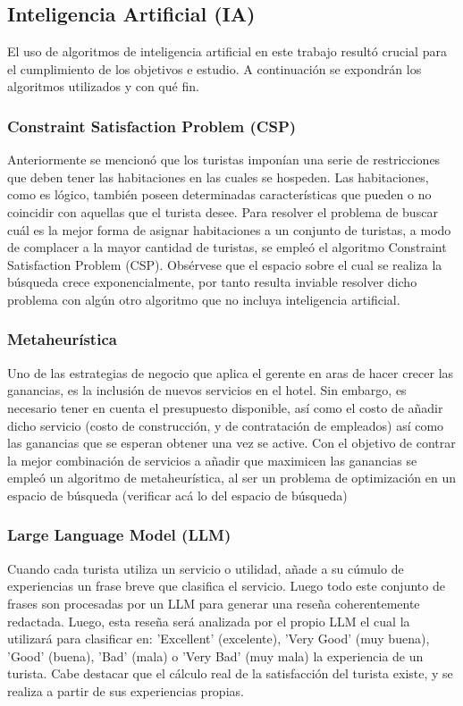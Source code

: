 \documentclass[12pt,a4paper]{article} \usepackage[spanish]{babel} \usepackage{graphicx} \usepackage{amsmath} \usepackage{amsfonts} \usepackage{amssymb} \usepackage{float} \usepackage{geometry}
\begin{document}
\subsection{Inteligencia Artificial (IA)}
El uso de algoritmos de inteligencia artificial en este trabajo resultó crucial para el cumplimiento de los objetivos e estudio. A continuación se expondrán los algoritmos utilizados y con qué fin.

\subsubsection{Constraint Satisfaction Problem (CSP)}
Anteriormente se mencionó que los turistas imponían una serie de restricciones que deben tener las habitaciones en las cuales se hospeden. Las habitaciones, como es lógico, también poseen determinadas características que pueden o no coincidir con aquellas que el turista desee. Para resolver el problema de buscar cuál es la mejor forma de asignar habitaciones a un conjunto de turistas, a modo de complacer a la mayor cantidad de turistas, se empleó el algoritmo Constraint Satisfaction Problem (CSP). Obsérvese que el espacio sobre el cual se realiza la búsqueda crece exponencialmente, por tanto resulta inviable resolver dicho problema con algún otro algoritmo que no incluya inteligencia artificial.

\subsubsection{Metaheurística}
Uno de las estrategias de negocio que aplica el gerente en aras de hacer crecer las ganancias, es la inclusión de nuevos servicios en el hotel. Sin embargo, es necesario tener en cuenta el presupuesto disponible, así como el costo de añadir dicho servicio (costo de construcción, y de contratación de empleados) así como las ganancias que se esperan obtener una vez se active. Con el objetivo de contrar la mejor combinación de servicios a añadir que maximicen las ganancias se empleó un algoritmo de metaheurística, al ser un problema de optimización en un espacio de búsqueda (verificar acá lo del espacio de búsqueda)

\subsubsection{Large Language Model (LLM)}
Cuando cada turista utiliza un servicio o utilidad, añade a su cúmulo de experiencias un frase breve que clasifica el servicio. Luego todo este conjunto de frases son procesadas por un LLM para generar una reseña coherentemente redactada. Luego, esta reseña será analizada por el propio LLM el cual la utilizará para clasificar en: 'Excellent' (excelente), 'Very Good' (muy buena), 'Good' (buena), 'Bad' (mala) o 'Very Bad' (muy mala) la experiencia de un turista. Cabe destacar que el cálculo real de la satisfacción del turista existe, y se realiza a partir de sus experiencias propias.
\end{document}
